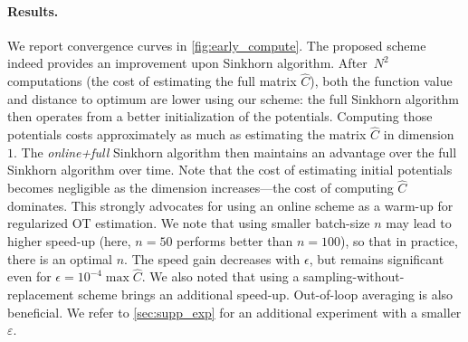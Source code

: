 \paragraph{Results.} We report convergence curves in
\autoref{fig:early_compute}. The proposed scheme indeed provides an improvement
upon Sinkhorn algorithm. After $N^2$ computations (the cost of estimating the
full matrix $\hat C$), both the function value and distance to optimum are lower
using our scheme: the full Sinkhorn algorithm then operates from a better
initialization of the potentials. Computing those potentials costs approximately as much as
estimating the matrix $\hat C$ in dimension $1$. The \textit{online+full}
Sinkhorn algorithm then maintains an advantage over the full Sinkhorn algorithm
over time. Note that the cost of estimating initial potentials becomes negligible
as the dimension increases---the cost of computing $\hat C$ dominates. This
strongly advocates for using an online scheme as a warm-up for regularized OT
estimation. We note that using smaller batch-size $n$ may lead to higher speed-up (here, $n=50$ performs better than $n=100$), so that in practice, there is an optimal $n$. The speed gain decreases with $\epsilon$, but remains
significant even for $\epsilon = 10^{-4} \max \hat C$. We also noted that
using a sampling-without-replacement scheme brings an additional speed-up. Out-of-loop averaging is also beneficial. We refer to \autoref{sec:supp_exp} for an additional experiment with a smaller $\varepsilon$.
